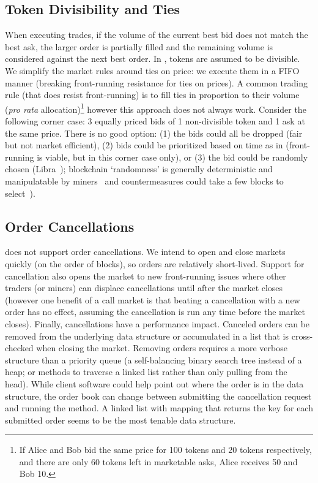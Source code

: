 \subsection{Token Divisibility and Ties} 

When executing trades, if the volume of the current best bid does not match the best ask, the larger order is partially filled and the remaining volume is considered against the next best order. In \cm, tokens are assumed to be divisible. We simplify the market rules around ties on price: we execute them in a FIFO manner (breaking front-running resistance for ties on prices). A common trading rule (that does resist front-running) is to fill ties in proportion to their volume (\ie \textit{pro rata} allocation)\footnote{If Alice and Bob bid the same price for 100 tokens and 20 tokens respectively, and there are only 60 tokens left in marketable asks, Alice receives 50 and Bob 10.} however this approach does not always work. Consider the following corner case: 3 equally priced bids of 1 non-divisible token and 1 ask at the same price. There is no good option: (1) the bids could all be dropped (fair but not market efficient), (2) bids could be prioritized based on time as in \cm (front-running is viable, but in this corner case only), or (3) the bid could be randomly chosen (\cf Libra~\cite{mavroudis2019libra}); blockchain `randomness' is generally deterministic and manipulatable by miners~\cite{bonneau2015random,buenz2017proofs} and countermeasures could take a few blocks to select~\cite{boneh2018verifiable}).

\subsection{Order Cancellations}

\cm does not support order cancellations. We intend to open and close markets quickly (on the order of blocks), so orders are relatively short-lived. Support for cancellation also opens the market to new front-running issues where other traders (or miners) can displace cancellations until after the market closes (however one benefit of a call market is that beating a cancellation with a new order has no effect, assuming the cancellation is run any time before the market closes). Finally, cancellations have a performance impact. Canceled orders can be removed from the underlying data structure   or accumulated in a list that is cross-checked when closing the market. Removing orders requires a more verbose structure than a priority queue (\eg a self-balancing binary search tree instead of a heap; or methods to traverse a linked list rather than only pulling from the head). While client software could help point out where the order is in the data structure, the order book can change between submitting the cancellation request and running the method. A linked list with mapping that returns the key for each submitted order seems to be the most tenable data structure. 

